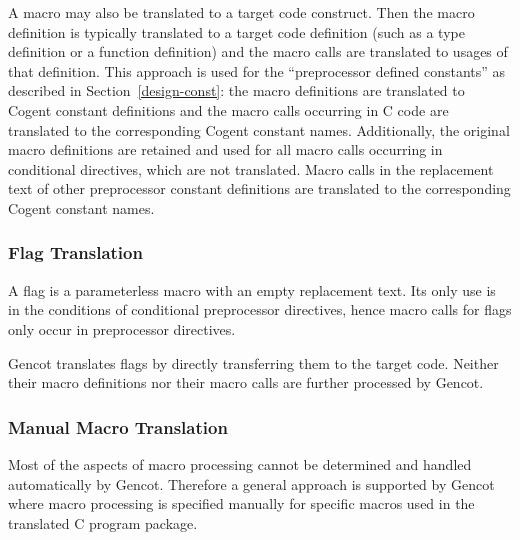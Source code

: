 A macro may also be translated to a target code construct. Then the macro definition is typically translated to 
a target code definition (such as a type definition or a function definition) and the macro calls are translated
to usages of that definition. This approach is used for the ``preprocessor defined constants'' as described in 
Section~\ref{design-const}: the macro definitions are translated to Cogent constant definitions and the macro 
calls occurring in C code are translated to the corresponding Cogent constant names. Additionally, the original
macro definitions are retained and used for all macro calls occurring in conditional directives, which are not
translated. Macro calls in the replacement text of other preprocessor constant definitions are translated to 
the corresponding Cogent constant names.

\subsubsection{Flag Translation}

A flag is a parameterless macro with an empty replacement text. Its only use is in the conditions of 
conditional preprocessor directives, hence macro calls for flags only occur in preprocessor directives.

Gencot translates flags by directly transferring them to the target code. Neither their macro definitions 
nor their macro calls are further processed by Gencot.

\subsubsection{Manual Macro Translation}

Most of the aspects of macro processing cannot be determined and handled automatically by Gencot. Therefore a
general approach is supported by Gencot where macro processing is specified manually for specific macros used in the
translated C program package.

